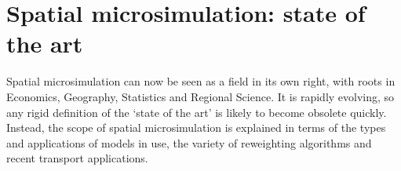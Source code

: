 % 
% 
% 
% 

\section{Spatial microsimulation: state of the art}
\label{s:sotart}
Spatial microsimulation can now be seen as a field in its own right, with roots
in Economics, Geography, Statistics and Regional Science.  It is rapidly
evolving, so any rigid definition of the `state of the art' is likely to become
obsolete quickly. Instead, the scope of spatial
microsimulation is explained in terms of the types and applications of models
in use, the variety of reweighting algorithms and recent transport applications.

